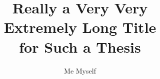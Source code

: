 \documentclass[english, online]{IASthesis}
\title{Really a Very Very\\ Extremely Long Title\\ for Such a Thesis}
\author{Me Myself}
\begin{document}
\maketitle              

\frontmatter
    
    
    
    \tableofcontents
    
\mainmatter

    
    
    
    

\backmatter
    
    
    \lists

    \ifdiss\iffinal\fi\fi %
\end{document}
